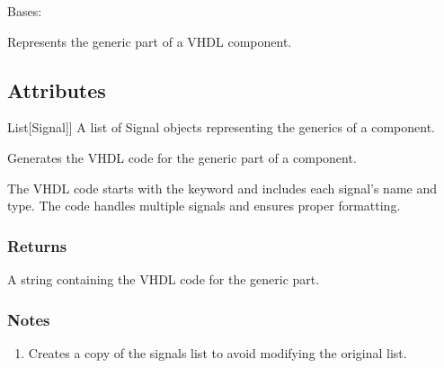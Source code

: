 \documentclass[letterpaper,10pt,english]{sphinxmanual}
\begin{document}
\begin{fulllineitems}
\label{\detokenize{generic:generic.Generic}}
\pysigstartsignatures
{}
\pysigstopsignatures
\sphinxAtStartPar
Bases: 

\sphinxAtStartPar
Represents the generic part of a VHDL component.


\subsection{Attributes}
\label{\detokenize{generic:attributes}}\begin{description}
\sphinxlineitem{signals\_list}{[}List{[}Signal{]}{]}
\sphinxAtStartPar
A list of Signal objects representing the generics of a component.

\end{description}

\begin{fulllineitems}
\label{\detokenize{generic:generic.Generic.generic_to_vhdl}}
\pysigstartsignatures
{}
\pysigstopsignatures
\sphinxAtStartPar
Generates the VHDL code for the generic part of a component.

\sphinxAtStartPar
The VHDL code starts with the  keyword and includes each signal’s name and type.
The code handles multiple signals and ensures proper formatting.


\subsubsection{Returns}
\label{\detokenize{generic:returns}}\begin{description}
\sphinxAtStartPar
A string containing the VHDL code for the generic part.

\end{description}


\subsubsection{Notes}
\label{\detokenize{generic:notes}}\begin{description}
\begin{enumerate}
%
\item {} 
\sphinxAtStartPar
Creates a copy of the signals list to avoid modifying the original list.


\end{enumerate}
\end{description}
\end{fulllineitems}
\end{fulllineitems}
\end{document}

